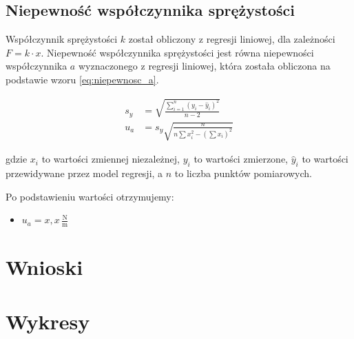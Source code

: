 \documentclass[a4paper,12pt]{article}
\begin{document}
\subsection{Niepewność współczynnika sprężystości}

Współczynnik sprężystości $k$ został obliczony z regresji liniowej, dla zależności $F = k \cdot x$. Niepewność współczynnika sprężystości jest równa niepewności współczynnika $a$ wyznaczonego z regresji liniowej, która została obliczona na podstawie wzoru \eqref{eq:niepewnosc_a}.


\begin{align}
    \label{eq:niepewnosc_a}
    s_y & = \sqrt{\frac{\sum_{i=1}^{n} (y_i - \hat{y}_i)^2}{n-2}}         \\
    u_a & = s_y \sqrt{\frac{n}{n \sum x_i^2 - \left( \sum x_i \right)^2}}
\end{align}

gdzie $x_i$ to wartości zmiennej niezależnej, $y_i$ to wartości zmierzone, $\hat{y}_i$ to wartości przewidywane przez model regresji, a $n$ to liczba punktów pomiarowych.

Po podstawieniu wartości otrzymujemy:

\begin{itemize}
    \item $u_a = x{,}x\,\frac{\text{N}}{\text{m}}$
\end{itemize}

\section{Wnioski}

\section{Wykresy}



\end{document}
